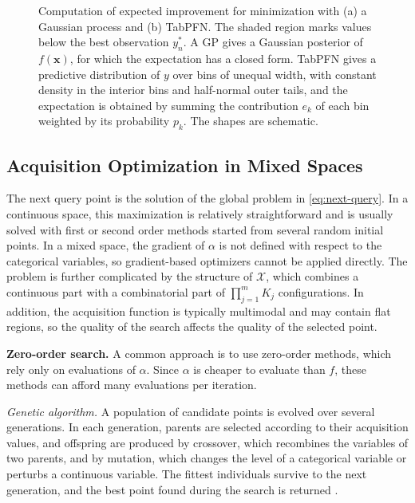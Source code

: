 
\begin{figure}[htbp]
  \centering
  \resizebox{\textwidth}{!}{%
    
  }
  \caption{Computation of expected improvement for minimization with (a) a Gaussian process and (b) TabPFN. The shaded region marks values below the best observation $y_n^*$. A GP gives a Gaussian posterior of $f(\boldsymbol{x})$, for which the expectation has a closed form. TabPFN gives a predictive distribution of $y$ over bins of unequal width, with constant density in the interior bins and half-normal outer tails, and the expectation is obtained by summing the contribution $e_k$ of each bin weighted by its probability $p_k$. The shapes are schematic.}
  \label{fig:ei-compare}
\end{figure}

\subsection{Acquisition Optimization in Mixed Spaces}\label{subsec:acquisition-optimization-mixed-spaces}

The next query point is the solution of the global problem in \eqref{eq:next-query}. In a continuous space, this maximization is relatively straightforward and is usually solved with first or second order methods started from several random initial points. In a mixed space, the gradient of $\alpha$ is not defined with respect to the categorical variables, so gradient-based optimizers cannot be applied directly. The problem is further complicated by the structure of $\mathcal{X}$, which combines a continuous part with a combinatorial part of $\prod_{j=1}^{m} K_j$ configurations. In addition, the acquisition function is typically multimodal and may contain flat regions, so the quality of the search affects the quality of the selected point.

\textbf{Zero-order search.} A common approach is to use zero-order methods, which rely only on evaluations of $\alpha$. Since $\alpha$ is cheaper to evaluate than $f$, these methods can afford many evaluations per iteration. %

\textit{Genetic algorithm.} A population of candidate points is evolved over several generations. In each generation, parents are selected according to their acquisition values, and offspring are produced by crossover, which recombines the variables of two parents, and by mutation, which changes the level of a categorical variable or perturbs a continuous variable. The fittest individuals survive to the next generation, and the best point found during the search is returned \citep{NEURIPS2020_b19aa25f}.

